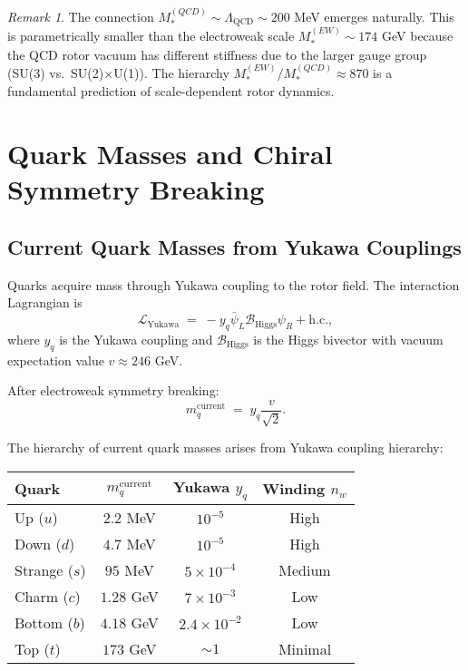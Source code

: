 \documentclass[11pt,a4paper]{article}
\newcommand{\Biv}{\mathcal{B}}
\newcommand{\Lag}{\mathcal{L}}
\theoremstyle{definition}
\theoremstyle{plain}
\theoremstyle{remark}
\newtheorem{remark}{Remark}[section]
\begin{document}
\begin{remark}
The connection $M_*^{(QCD)} \sim \Lambda_{\mathrm{QCD}} \sim 200$ MeV emerges naturally. This is parametrically smaller than the electroweak scale $M_*^{(EW)} \sim 174$ GeV because the QCD rotor vacuum has different stiffness due to the larger gauge group (SU(3) vs.\ SU(2)$\times$U(1)). The hierarchy $M_*^{(EW)}/M_*^{(QCD)} \approx 870$ is a fundamental prediction of scale-dependent rotor dynamics.
\end{remark}

\vspace{1em}

\section{Quark Masses and Chiral Symmetry Breaking}
\label{sec:quark-masses}

\subsection{Current Quark Masses from Yukawa Couplings}

Quarks acquire mass through Yukawa coupling to the rotor field. The interaction Lagrangian is
\begin{equation}
\Lag_{\mathrm{Yukawa}} \;=\; -y_q \bar{\psi}_L \Biv_{\mathrm{Higgs}} \psi_R + \text{h.c.},
\label{eq:quark-yukawa}
\end{equation}
where $y_q$ is the Yukawa coupling and $\Biv_{\mathrm{Higgs}}$ is the Higgs bivector with vacuum expectation value $v \approx 246$ GeV.

After electroweak symmetry breaking:
\begin{equation}
m_q^{\mathrm{current}} \;=\; y_q \frac{v}{\sqrt{2}}.
\label{eq:current-mass}
\end{equation}

The hierarchy of current quark masses arises from Yukawa coupling hierarchy:
\begin{center}
\begin{tabular}{lccc}
\toprule
Quark & $m_q^{\mathrm{current}}$ & Yukawa $y_q$ & Winding $n_w$ \\
\midrule
Up ($u$)     & $2.2$ MeV   & $10^{-5}$ & High \\
Down ($d$)   & $4.7$ MeV   & $10^{-5}$ & High \\
Strange ($s$)& $95$ MeV    & $5 \times 10^{-4}$ & Medium \\
Charm ($c$)  & $1.28$ GeV  & $7 \times 10^{-3}$ & Low \\
Bottom ($b$) & $4.18$ GeV  & $2.4 \times 10^{-2}$ & Low \\
Top ($t$)    & $173$ GeV   & $\sim 1$ & Minimal \\
\bottomrule
\end{tabular}
\end{center}
\end{document}
